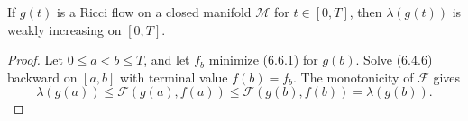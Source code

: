 \begin{theorem}
\label{topping-gradient-flow-z0-eigenvalue-monotone}

If $g(t)$ is a Ricci flow on a closed manifold $\mathcal M$ for
$t\in[0,T]$, then $\lambda(g(t))$ is weakly increasing on $[0,T]$.
\end{theorem}

\begin{proof}
\sketch Let $0\leq a<b\leq T$, and let $f_b$ minimize (6.6.1) for $g(b)$.
Solve (6.4.6) backward on $[a,b]$ with terminal value $f(b)=f_b$. The
monotonicity of $\mathcal F$ gives
\[
\lambda(g(a))\leq\mathcal F(g(a),f(a))
\leq\mathcal F(g(b),f(b))=\lambda(g(b)).
\]
\end{proof}
